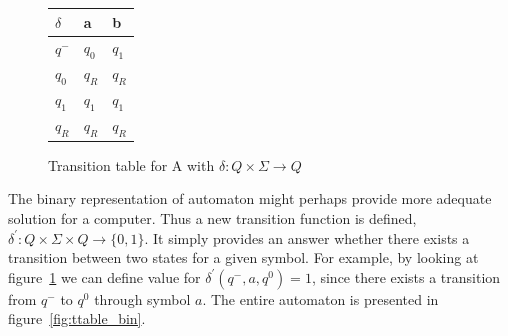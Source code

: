\documentclass{mini}
\begin{document}
%
%
\begin{figure}[H]
    \CenterFloatBoxes
    \begin{floatrow}
        
        \ttabbox
        {
            \centering
            \setlength{\tabcolsep}{15pt}
            \renewcommand{\arraystretch}{1.5}
            \begin{tabular}{|P{1.0cm} || P{0.6cm} | P{0.6cm} |}
                \hline
                $\delta$ & a & b \\
                \hline
                \hline
                $q^-$ 		& $q_0$ & $q_1$ \\
                \hline
                $q_0 $ 		& $q_R$ & $q_R$ \\
                \hline
                $q_1 $ 		& $q_1$ & $q_1$ \\
                \hline
                $q_R$  					& $q_R$ & $q_R$ \\
                \hline
            \end{tabular}
        }
        {\caption{Transition table for A with $\delta: Q \times \Sigma \rightarrow Q$}\label{fig:ttable_std}}
        
        
    \end{floatrow}
\end{figure}


The binary representation of automaton might perhaps provide more adequate solution for a computer. Thus a new transition function is defined, $\delta^{'}: Q \times \Sigma \times Q \rightarrow \{0,1\}$. It simply provides an answer whether there exists a transition between two states for a given symbol. For example, by looking at figure~\ref{fig:ttable_std} we can define value for $\delta^{'}(q^-,a,q^0) = 1$, since there exists a transition from $q^-$ to $q^0$ through symbol $a$. The entire automaton is presented in figure~\ref{fig:ttable_bin}.
\end{document}
